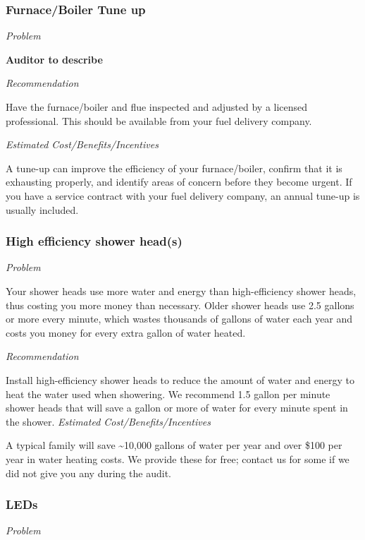 \documentclass[
  letterpaper,
  DIV=11,
  numbers=noendperiod]{scrartcl}
\begin{document}
\subsubsection{Furnace/Boiler Tune up}\label{furnaceboiler-tune-up}

\emph{Problem}

\textbf{Auditor to describe}

\emph{Recommendation}

Have the furnace/boiler and flue inspected and adjusted by a licensed
professional. This should be available from your fuel delivery company.

\emph{Estimated Cost/Benefits/Incentives}

A tune-up can improve the efficiency of your furnace/boiler, confirm
that it is exhausting properly, and identify areas of concern before
they become urgent. If you have a service contract with your fuel
delivery company, an annual tune-up is usually included.

\subsubsection{High efficiency shower
head(s)}\label{high-efficiency-shower-heads}

\emph{Problem}

Your shower heads use more water and energy than high-efficiency shower
heads, thus costing you more money than necessary. Older shower heads
use 2.5 gallons or more every minute, which wastes thousands of gallons
of water each year and costs you money for every extra gallon of water
heated.

\emph{Recommendation}

Install high-efficiency shower heads to reduce the amount of water and
energy to heat the water used when showering. We recommend 1.5 gallon
per minute shower heads that will save a gallon or more of water for
every minute spent in the shower. \emph{Estimated
Cost/Benefits/Incentives}

A typical family will save \textasciitilde10,000 gallons of water per
year and over \$100 per year in water heating costs. We provide these
for free; contact us for some if we did not give you any during the
audit.

\subsubsection{LEDs}\label{leds}

\emph{Problem}
\end{document}
